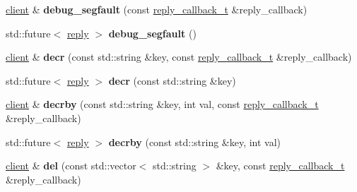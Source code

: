 \begin{DoxyCompactItemize}
\hyperlink{classcpp__redis_1_1client}{client} \& {\bfseries debug\+\_\+segfault} (const \hyperlink{classcpp__redis_1_1client_a061a1140d36d2eaeda82b09a0bb3f9f2}{reply\+\_\+callback\+\_\+t} \&reply\+\_\+callback)
\item 
\mbox{\label{classcpp__redis_1_1client_a764786e7003c538a6cf0a5d6b44d66dd}} 
std\+::future$<$ \hyperlink{classcpp__redis_1_1reply}{reply} $>$ {\bfseries debug\+\_\+segfault} ()
\item 
\mbox{\label{classcpp__redis_1_1client_a8e09d5753d9f9ba00b1d5e8aed306189}} 
\hyperlink{classcpp__redis_1_1client}{client} \& {\bfseries decr} (const std\+::string \&key, const \hyperlink{classcpp__redis_1_1client_a061a1140d36d2eaeda82b09a0bb3f9f2}{reply\+\_\+callback\+\_\+t} \&reply\+\_\+callback)
\item 
\mbox{\label{classcpp__redis_1_1client_ac80abd9a238a7613294d4444bbc92907}} 
std\+::future$<$ \hyperlink{classcpp__redis_1_1reply}{reply} $>$ {\bfseries decr} (const std\+::string \&key)
\item 
\mbox{\label{classcpp__redis_1_1client_aaa45a662abeaa66f5a8c985cd27957c8}} 
\hyperlink{classcpp__redis_1_1client}{client} \& {\bfseries decrby} (const std\+::string \&key, int val, const \hyperlink{classcpp__redis_1_1client_a061a1140d36d2eaeda82b09a0bb3f9f2}{reply\+\_\+callback\+\_\+t} \&reply\+\_\+callback)
\item 
\mbox{\label{classcpp__redis_1_1client_ac4fe81368d7f9cc305811d8346e60881}} 
std\+::future$<$ \hyperlink{classcpp__redis_1_1reply}{reply} $>$ {\bfseries decrby} (const std\+::string \&key, int val)
\item 
\mbox{\label{classcpp__redis_1_1client_a29a5307b20d9ffe951e2ff302797a296}} 
\hyperlink{classcpp__redis_1_1client}{client} \& {\bfseries del} (const std\+::vector$<$ std\+::string $>$ \&key, const \hyperlink{classcpp__redis_1_1client_a061a1140d36d2eaeda82b09a0bb3f9f2}{reply\+\_\+callback\+\_\+t} \&reply\+\_\+callback)
\item 
\mbox{\label{classcpp__redis_1_1client_a99c090de7e23accfaf3b93f4b025d2e9}} 

\end{DoxyCompactItemize}
